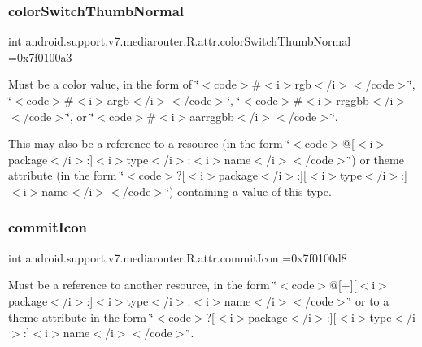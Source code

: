 \subsubsection{\texorpdfstring{color\+Switch\+Thumb\+Normal}{colorSwitchThumbNormal}}
{\footnotesize\ttfamily int android.\+support.\+v7.\+mediarouter.\+R.\+attr.\+color\+Switch\+Thumb\+Normal =0x7f0100a3\hspace{0.3cm}{\ttfamily [static]}}

Must be a color value, in the form of \char`\"{}$<$code$>$\#$<$i$>$rgb$<$/i$>$$<$/code$>$\char`\"{}, \char`\"{}$<$code$>$\#$<$i$>$argb$<$/i$>$$<$/code$>$\char`\"{}, \char`\"{}$<$code$>$\#$<$i$>$rrggbb$<$/i$>$$<$/code$>$\char`\"{}, or \char`\"{}$<$code$>$\#$<$i$>$aarrggbb$<$/i$>$$<$/code$>$\char`\"{}. 

This may also be a reference to a resource (in the form \char`\"{}$<$code$>$@\mbox{[}$<$i$>$package$<$/i$>$\+:\mbox{]}$<$i$>$type$<$/i$>$\+:$<$i$>$name$<$/i$>$$<$/code$>$\char`\"{}) or theme attribute (in the form \char`\"{}$<$code$>$?\mbox{[}$<$i$>$package$<$/i$>$\+:\mbox{]}\mbox{[}$<$i$>$type$<$/i$>$\+:\mbox{]}$<$i$>$name$<$/i$>$$<$/code$>$\char`\"{}) containing a value of this type. \mbox{\label{classandroid_1_1support_1_1v7_1_1mediarouter_1_1R_1_1attr_a0800b9b67e1f73a4a0923cf4e1122759}} 
\subsubsection{\texorpdfstring{commit\+Icon}{commitIcon}}
{\footnotesize\ttfamily int android.\+support.\+v7.\+mediarouter.\+R.\+attr.\+commit\+Icon =0x7f0100d8\hspace{0.3cm}{\ttfamily [static]}}

Must be a reference to another resource, in the form \char`\"{}$<$code$>$@\mbox{[}+\mbox{]}\mbox{[}$<$i$>$package$<$/i$>$\+:\mbox{]}$<$i$>$type$<$/i$>$\+:$<$i$>$name$<$/i$>$$<$/code$>$\char`\"{} or to a theme attribute in the form \char`\"{}$<$code$>$?\mbox{[}$<$i$>$package$<$/i$>$\+:\mbox{]}\mbox{[}$<$i$>$type$<$/i$>$\+:\mbox{]}$<$i$>$name$<$/i$>$$<$/code$>$\char`\"{}. \mbox{\label{classandroid_1_1support_1_1v7_1_1mediarouter_1_1R_1_1attr_a1e18403cb2eb932c1f1398fb56b2b848}} 
